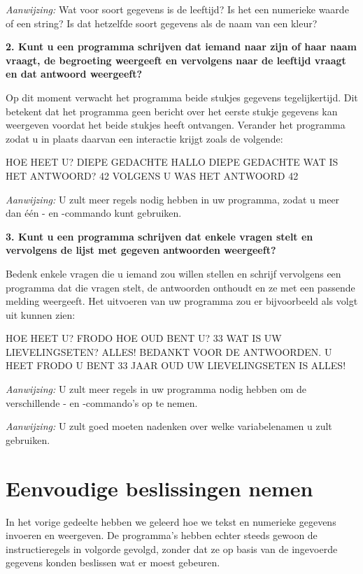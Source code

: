 {\em Aanwijzing:} Wat voor soort gegevens is de leeftijd? Is het een numerieke waarde of een string? Is dat hetzelfde soort gegevens als de naam van een kleur?

{\bf 2. Kunt u een programma schrijven dat iemand naar zijn of haar naam vraagt, de begroeting weergeeft en vervolgens naar de leeftijd vraagt en dat antwoord weergeeft?}

  \needspace{2cm}
Op dit moment verwacht het programma beide stukjes gegevens tegelijkertijd. Dit betekent dat het programma geen bericht over het eerste stukje gegevens kan weergeven voordat het beide stukjes heeft ontvangen. Verander het programma zodat u in plaats daarvan een interactie krijgt zoals de volgende:

\begin{screencode}
HOE HEET U? DIEPE GEDACHTE
HALLO DIEPE GEDACHTE
WAT IS HET ANTWOORD? 42
VOLGENS U WAS HET ANTWOORD 42
\end{screencode}

{\em Aanwijzing:} U zult meer regels nodig hebben in uw programma, zodat u meer dan één - en -commando kunt gebruiken.

{\bf 3. Kunt u een programma schrijven dat enkele vragen stelt en vervolgens de lijst met gegeven antwoorden weergeeft?}

\needspace{2cm}
Bedenk enkele vragen die u iemand zou willen stellen en schrijf vervolgens een programma dat die vragen stelt, de antwoorden onthoudt en ze met een passende melding weergeeft. Het uitvoeren van uw programma zou er bijvoorbeeld als volgt uit kunnen zien:

\begin{screencode}
  HOE HEET U? FRODO
  HOE OUD BENT U? 33
  WAT IS UW LIEVELINGSETEN? ALLES!
  BEDANKT VOOR DE ANTWOORDEN.
  U HEET FRODO
  U BENT 33 JAAR OUD
  UW LIEVELINGSETEN IS ALLES!
\end{screencode}

{\em Aanwijzing:} U zult meer regels in uw programma nodig hebben om de verschillende - en -commando's op te nemen.

{\em Aanwijzing:} U zult goed moeten nadenken over welke variabelenamen u zult gebruiken.

\section{Eenvoudige beslissingen nemen}

In het vorige gedeelte hebben we geleerd hoe we tekst en numerieke gegevens invoeren en weergeven. De programma's hebben echter steeds gewoon de instructieregels in volgorde gevolgd, zonder dat ze op basis van de ingevoerde gegevens konden beslissen wat er moest gebeuren.

